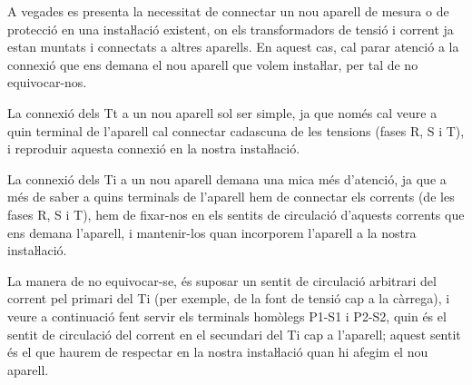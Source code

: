 A vegades es presenta la necessitat de connectar un nou aparell de
mesura o de protecció en una instaŀlació existent, on els
transformadors de tensió i corrent ja estan muntats i connectats a
altres aparells. En aquest cas, cal parar atenció a la connexió
que ens demana el nou aparell que volem instaŀlar, per tal de no
equivocar-nos.

La connexió dels Tt a un nou aparell sol ser simple, ja que només
cal veure a quin terminal de l'aparell cal connectar cadascuna de
les tensions (fases R, S i T), i reproduir aquesta connexió en la
nostra instaŀlació.

La connexió dels Ti a un nou aparell demana una mica més
d'atenció, ja que a més de saber a  quins terminals de l'aparell hem
de connectar els corrents (de les fases R, S i T), hem de fixar-nos
en els sentits de circulació d'aquests corrents que ens demana
l'aparell, i mantenir-los quan incorporem l'aparell a la nostra
instaŀlació.

 La manera de no equivocar-se, és suposar un sentit de
circulació arbitrari del corrent  pel primari del Ti (per exemple,
de la font de tensió cap a la càrrega), i veure a continuació fent
servir els terminals homòlegs P1-S1 i P2-S2, quin és el sentit de
circulació del corrent en el secundari del Ti cap a l'aparell;
aquest sentit és el que haurem de respectar en la nostra
instaŀlació quan hi afegim el nou aparell.


